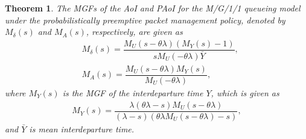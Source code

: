 \documentclass[conference]{IEEEtran}
\newtheorem{theorem}{Theorem}
\def\blue{\textcolor{blue}}
\newcommand{\RY}[1]{{\color{red} RY: #1}}
\begin{document}
\begin{theorem}\label{T_source-aware}
 The MGFs of the AoI and PAoI for the M/G/1/1 queueing model under the probabilistically preemptive packet management policy, denoted by $M_{\delta}(s)$ and $M_{A}(s)$, respectively, are given as
\begin{align}
&{M_{\delta}(s)}=\dfrac{M_U(s-\theta\lambda)(M_{Y}(s)-1)}{sM_{U}(-\theta\lambda)\bar{Y}},\\&
M_{A}(s)=\dfrac{M_U(s-\theta\lambda)M_{Y}(s)}{M_{U}(-\theta\lambda)},
\end{align}
where $M_{Y}(s)$ is the MGF of the interdeparture time $Y$, which is given as
\begin{align}
M_{Y}(s)=\dfrac{\lambda(\theta\lambda-s)M_U(s-\theta\lambda)}{(\lambda-s)(\theta\lambda M_U(s-\theta\lambda)-s)},
\end{align}  
 and $\bar{Y}$ is mean interdeparture time.
\end{theorem}
\end{document}
